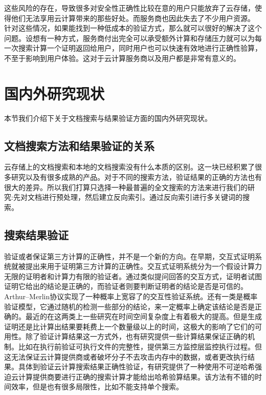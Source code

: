 这些风险的存在，导致很多对安全性正确性比较在意的用户只能放弃了云存储，使得他们无法享用云计算带来的那些好处。而服务商也因此失去了不少用户资源。
针对这些情况，如果能找到一种低成本的验证方式，那么就可以很好的解决了这个问题。设想有一种方式，服务商付出完全可以承受额外计算和存储压力就可以为每一次搜索计算一个证明返回给用户，同时用户也可以快速有效地进行正确性验算，不至于影响到用户体验。这对于云计算服务商以及用户都是非常有意义的。

\section{国内外研究现状}
本节我们介绍下关于文档搜索与结果验证方面的国内外研究现状。

\subsection{文档搜索方法和结果验证的关系}
		云存储上的文档搜索和本地的文档搜索没有什么本质的区别。这一块已经积累了很多研究以及有很多成熟的产品。对于不同的搜索方法，验证结果的正确的方法也有很大的差异。所以我们打算只选择一种最普遍的全文搜索的方法来进行我们的研究:先对文档进行预处理，然后建立反向索引。通过反向索引进行多关键词的搜索。
\subsection{搜索结果验证}
				 验证或者保证第三方计算的正确性，并不是一个新的方向。在早期，交互式证明系统就被提出来用于证明第三方计算的正确性。交互式证明系统分为一个假设计算力无限的证明者和计算力有限的验证者。通过类似提问回答的交互方式，证明者试图证明它给出的结论是正确的，而验证者则要判断证明者的结论是否是可信的。Arthur–Merlin协议实现了一种概率上宽容了的交互性验证系统。还有一类是概率验证模型，它通过随机的检测一些部分的结论，来一定概率上确定该结论是否是正确的。最近的在这两类上一些研究在时间空间复杂度上有着极大的提高。但是生成证明还是比计算出结果要耗费上一个数量级以上的时间，这极大的影响了它们的可用性。除了验证计算结果这一方式外，也有研究提供一些计算结果保证正确的机制。比如在执行前验证可执行文件的完整性，提供第三方监控层监控执行过程。但这无法保证云计算提供商或者破坏分子不去攻击内存中的数据，或者更改执行结果。具体到验证云计算搜索结果正确性验证，有研究提供了一种使用不可逆哈希强迫云计算提供商要进行正确的搜索计算才能给出哈希验算结果。该方法有不错的时间效率，但是也有很多局限性，比如不能支持单个搜索。

